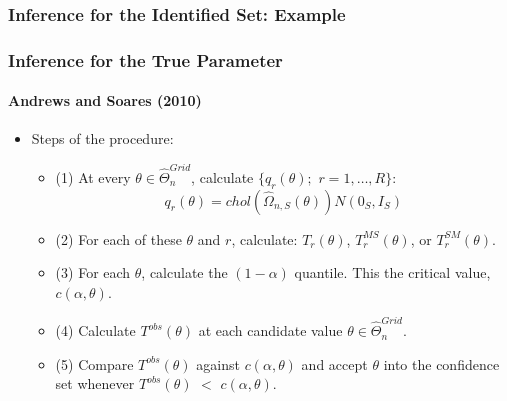 \documentclass[notes=show]{beamer}
\begin{document}

\begin{frame}
\frametitle{Inference for the Identified Set: Example}

\begin{figure}[h!]
\begin{center}
\end{center}
\end{figure}
\end{frame}


\begin{frame}
\frametitle{Inference for the True Parameter}
\framesubtitle{Andrews and Soares (2010)}

\begin{itemize}
\item Steps of the procedure: 

\begin{itemize}
\item (1) At every $\theta \in \widehat{\Theta }_{n}^{Grid}$, calculate $%
\{q_{r}(\theta );$ $r=1,\dots ,R\}$: 
\begin{equation*}
q_{r}(\theta )=chol(\widehat{\Omega }_{n,S}(\theta ))N(0_{S},I_{S})
\end{equation*}

\item (2) For each of these $\theta $ and $r$, calculate: $T_{r}(\theta )$, $%
T_{r}^{MS}(\theta )$, or $T_{r}^{SM}(\theta )$. 

\item (3) For each $\theta $, calculate the $(1-\alpha )$ quantile. This the
critical value, $c(\alpha ,\theta )$. 

\item (4) Calculate $T^{obs}(\theta )$ at each candidate value $\theta \in 
\widehat{\Theta }_{n}^{Grid}$. 

\item (5) Compare $T^{obs}(\theta )$ against $c(\alpha ,\theta )$ and accept 
$\theta $ into the confidence set whenever $T^{obs}(\theta )$ $<$ $c(\alpha
,\theta )$. 
\end{itemize}
\end{itemize}
\end{frame}
\end{document}
